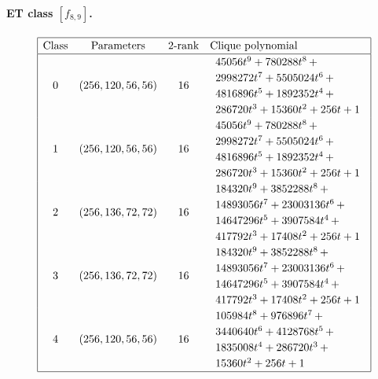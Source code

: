 \documentclass[12pt,a4paper]{article}
\begin{document}
\paragraph*{ET class $[f_{8,9}]$.}
%
\begin{table}[!bhpt] %
\small{}
\begin{align*}
\def\arraystretch{1.2}
\begin{array}{|cccl|}
\hline
\text{Class} &
\text{Parameters} &
\text{2-rank} &
\text{Clique polynomial}
\\
\hline
0 &
(256, 120, 56, 56) &
16 &
\begin{array}{l}
45056t^{9} + 780288t^{8}
\,+
\\
 2998272t^{7} + 5505024t^{6}
\,+
\\
 4816896t^{5} + 1892352t^{4}
\,+
\\
 286720t^{3} + 15360t^{2} + 256t + 1
\end{array}
\\
1 &
(256, 120, 56, 56) &
16 &
\begin{array}{l}
45056t^{9} + 780288t^{8}
\,+
\\
 2998272t^{7} + 5505024t^{6}
\,+
\\
 4816896t^{5} + 1892352t^{4}
\,+
\\
 286720t^{3} + 15360t^{2} + 256t + 1
\end{array}
\\
2 &
(256, 136, 72, 72) &
16 &
\begin{array}{l}
184320t^{9} + 3852288t^{8}
\,+
\\
 14893056t^{7} + 23003136t^{6}
\,+
\\
 14647296t^{5} + 3907584t^{4}
\,+
\\
 417792t^{3} + 17408t^{2} + 256t + 1
\end{array}
\\
3 &
(256, 136, 72, 72) &
16 &
\begin{array}{l}
184320t^{9} + 3852288t^{8}
\,+
\\
 14893056t^{7} + 23003136t^{6}
\,+
\\
 14647296t^{5} + 3907584t^{4}
\,+
\\
 417792t^{3} + 17408t^{2} + 256t + 1
\end{array}
\\
4 &
(256, 120, 56, 56) &
16 &
\begin{array}{l}
105984t^{8} + 976896t^{7}
\,+
\\
 3440640t^{6} + 4128768t^{5}
\,+
\\
 1835008t^{4} + 286720t^{3}
\,+
\\
 15360t^{2} + 256t + 1
\end{array}
\\
\hline
\end{array}
\end{align*}
\caption{$f_{8,9}$ extended Cayley classes (part 1)}
\label{tab-c8_9_EC_classes}
\end{table}
\end{document}
